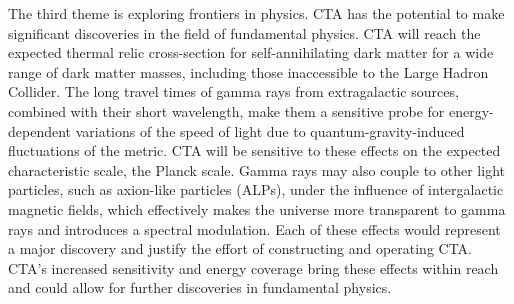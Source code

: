 The third theme is exploring frontiers in physics. CTA has the potential to make significant discoveries in the field of fundamental physics. CTA will reach the expected thermal relic cross-section for self-annihilating dark matter for a wide range of dark matter masses, including those inaccessible to the Large Hadron Collider. The long travel times of gamma rays from extragalactic sources, combined with their short wavelength, make them a sensitive probe for energy-dependent variations of the speed of light due to quantum-gravity-induced fluctuations of the metric. CTA will be sensitive to these effects on the expected characteristic scale, the Planck scale. Gamma rays may also couple to other light particles, such as axion-like particles (ALPs), under the influence of intergalactic magnetic fields, which effectively makes the universe more transparent to gamma rays and introduces a spectral modulation. Each of these effects would represent a major discovery and justify the effort of constructing and operating CTA. CTA's increased sensitivity and energy coverage bring these effects within reach and could allow for further discoveries in fundamental physics.



